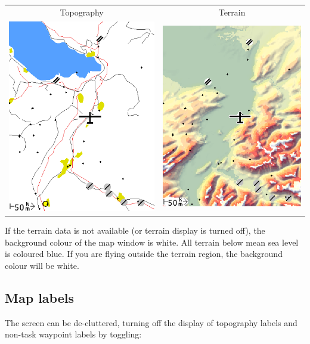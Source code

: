 \begin{center}
\begin{tabular}{c c}
Topography & Terrain \\
\includegraphics[angle=0,width=0.4\linewidth,keepaspectratio='true']{figures/cut-topo.png} &
\includegraphics[angle=0,width=0.4\linewidth,keepaspectratio='true']{figures/cut-terrain.png} \\
\end{tabular}

\end{center}

If the terrain data is not available (or terrain display is turned
off), the background colour of the map window is white.  All terrain
below mean sea level is coloured blue.  If you are flying outside the
terrain region, the background colour will be white.

\subsection*{Map labels}\label{sec:maplabels}

The screen can be de-cluttered, turning off the display of topography
labels and non-task waypoint labels by toggling:
\begin{quote}
\blink{}
\end{quote}

